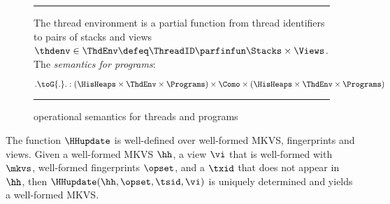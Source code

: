 \begin{figure}[!ht]
\hrule\vspace{5pt}
\begin{flushleft}
The thread environment is a partial function from thread identifiers to pairs of stacks and views \( \thdenv \in \ThdEnv \defeq \ThreadID \parfinfun \Stacks \times \Views \).
The \emph{semantics for programs}:
\end{flushleft}
\[
	. \toG{.} . : 
    ( \HisHeaps \times \ThdEnv \times \Programs) 
    \times \Como 
    \times ( \HisHeaps \times \ThdEnv \times \Programs) 
\]
\begin{mathpar}
\end{mathpar}
%
\hrule
\caption{operational semantics for threads and programs}
\label{def:thread_semantics}
\label{fig:thread_semantics}
\label{def:thread_pool_semantics}
\label{def:program_semantics}
\label{fig:thread_pool_semantics}
\end{figure}

\begin{lemma}
\label{lem:hhupdate.welldefined}
The function $\HHupdate$ is well-defined over well-formed MKVS, fingerprints and views. 
Given a well-formed MKVS $\hh$, a view $\vi$ that is well-formed with \( \mkvs \), well-formed fingerprints \( \opset \), and a $\txid$ that does not appear in $\hh$, then $\HHupdate(\hh, \opset, \tsid, \vi)$ is uniquely determined and yields a well-formed MKVS.
\end{lemma}


